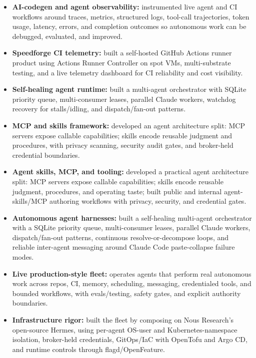 \ifdefined\DatadogVariant
\begin{itemize}
  \item \textbf{AI-codegen and agent observability:} instrumented live agent and CI workflows around traces, metrics, structured logs, tool-call trajectories, token usage, latency, errors, and completion outcomes so autonomous work can be debugged, evaluated, and improved.
  \item \textbf{Speedforge CI telemetry:} built a self-hosted GitHub Actions runner product using Actions Runner Controller on spot VMs, multi-substrate testing, and a live telemetry dashboard for CI reliability and cost visibility.
  \item \textbf{Self-healing agent runtime:} built a multi-agent orchestrator with SQLite priority queue, multi-consumer leases, parallel Claude workers, watchdog recovery for stalls/idling, and dispatch/fan-out patterns.
  \item \textbf{MCP and skills framework:} developed an agent architecture split: MCP servers expose callable capabilities; skills encode reusable judgment and procedures, with privacy scanning, security audit gates, and broker-held credential boundaries.
\end{itemize}
\else
\begin{itemize}
  \item \textbf{Agent skills, MCP, and tooling:} developed a practical agent architecture split: MCP servers expose callable capabilities; skills encode reusable judgment, procedures, and operating taste; built public and internal agent-skills/MCP authoring workflows with privacy, security, and credential gates.
  \item \textbf{Autonomous agent harnesses:} built a self-healing multi-agent orchestrator with a SQLite priority queue, multi-consumer leases, parallel Claude workers, dispatch/fan-out patterns, continuous resolve-or-decompose loops, and reliable inter-agent messaging around Claude Code paste-collapse failure modes.
  \item \textbf{Live production-style fleet:} operates agents that perform real autonomous work across repos, CI, memory, scheduling, messaging, credentialed tools, and bounded workflows, with evals/testing, safety gates, and explicit authority boundaries.
  \item \textbf{Infrastructure rigor:} built the fleet by composing on Nous Research's open-source Hermes, using per-agent OS-user and Kubernetes-namespace isolation, broker-held credentials, GitOps/IaC with OpenTofu and Argo CD, and runtime controls through flagd/OpenFeature.
\end{itemize}
\fi
